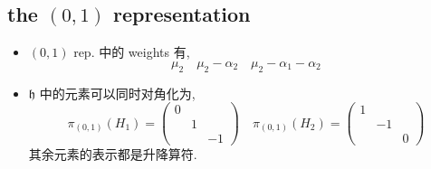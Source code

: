 \subsection{the \texorpdfstring{$(0, 1)$}{(0, 1)} representation}
\begin{itemize}
	\item $(0, 1)$ rep. 中的 weights 有,
	\begin{equation}
		\mu_2 \quad \mu_2 - \alpha_2 \quad \mu_2 - \alpha_1 - \alpha_2
	\end{equation}
	
	\item $\mathfrak{h}$ 中的元素可以同时对角化为,
	\begin{equation}
		\pi_{(0, 1)}(H_1) = \begin{pmatrix}
			0 & & \\
			& 1 & \\
			& & - 1
		\end{pmatrix} \quad \pi_{(0, 1)}(H_2) = \begin{pmatrix}
			1 & & \\
			& - 1 & \\
			& & 0
		\end{pmatrix}
	\end{equation}
	其余元素的表示都是升降算符.
\end{itemize}

